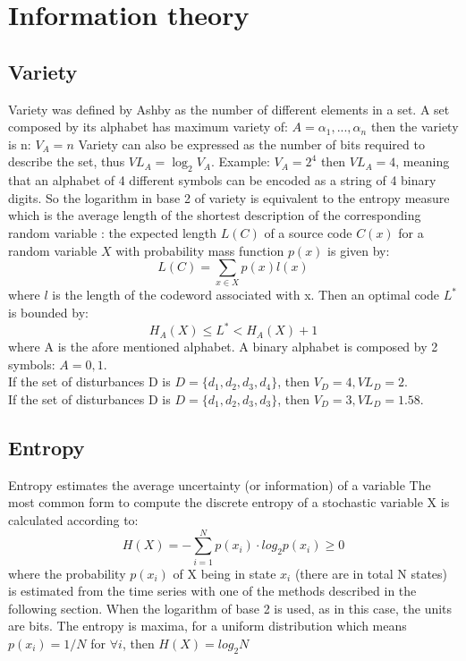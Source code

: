 
\section{Information theory}
\subsection{Variety}
Variety was defined by Ashby as the number of different elements in a set.
A set composed by its alphabet has maximum variety of: $A={\alpha_1,...,\alpha_n}$
then the variety is n: $V_A=n$
Variety can also be expressed as the number of bits required to describe the set,
thus $VL_A=\log_2 V_A$.
Example: $V_A=2^{4}$ then $VL_A=4$, meaning that an alphabet of 4 different
symbols can be encoded as a string of 4 binary digits. So the logarithm in
base 2 of variety is equivalent to the entropy measure which is the average
length of the shortest description of the corresponding random variable
\citep{Shannon76}: the expected length $L(C)$ of a source code $C(x)$ for
a random variable $X$ with probability mass function $p(x)$ is given by:
\begin{equation}
 L(C)=\sum_{x\in X}p(x)l(x)
\end{equation}
where $l$ is the length of the codeword associated with x.
Then an optimal code $L^*$ is bounded by:
\begin{equation}
 H_A(X)\leq L^* < H_A(X)+1
\end{equation}
where A is the afore mentioned alphabet. A binary alphabet is
composed by 2 symbols: $A={0,1}$.\\
If the set of disturbances D is $D=\{ d_1,d_2,d_3,d_4 \}$, then $V_D=4,VL_D=2$.\\
If the set of disturbances D is $D=\{ d_1,d_2,d_3,d_3 \}$, then $V_D=3,VL_D=1.58$.\\

\subsection{Entropy}
Entropy estimates the average uncertainty (or information) of a variable \citep{Shannon76}
The most common form to compute the discrete entropy of a stochastic variable X is calculated according to:
\begin{equation}
 H(X)=-\sum_{i=1}^{N} p(x_{i})\cdot log_2 p(x_i) \geq 0
\end{equation}
where the probability $p(x_i)$ of X being in state $x_i$ (there are in total N states)
is estimated from the time series with one of the methods described in the following section.
When the logarithm of base 2 is used, as in this case, the units are bits.
The entropy is maxima, for a uniform distribution which means
$p(x_{i})=1/N$ for $\forall i$, then $H(X)=log_2 N$

